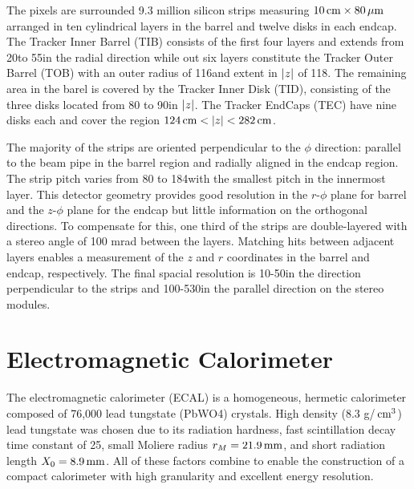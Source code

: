The pixels are surrounded 9.3 million silicon strips measuring $10\,\text{cm}\times 80\,\mu\text{m}$ arranged in ten cylindrical layers in the barrel and twelve disks in each endcap.
The Tracker Inner Barrel (TIB) consists of the first four layers and extends from 20\cm to 55\cm in the radial direction while out six layers constitute the Tracker Outer Barrel (TOB) with an outer radius of 116\cm and extent in $\lvert z \rvert$ of 118\cm.
The remaining area in the barel is covered by the Tracker Inner Disk (TID), consisting of the three disks located from 80 to 90\cm in $\lvert z \rvert$.
The Tracker EndCaps (TEC) have nine disks each and cover the region $124\,\text{cm} < \lvert z \rvert < 282\,\text{cm}$.

The majority of the strips are oriented perpendicular to the $\phi$ direction: parallel to the beam pipe in the barrel region and radially aligned in the endcap region.
The strip pitch varies from 80 to 184\mum with the smallest pitch in the innermost layer.
This detector geometry provides good resolution in the $r$-$\phi$ plane for barrel and the $z$-$\phi$ plane for the endcap but little information on the orthogonal directions.
To compensate for this, one third of the strips are double-layered with a stereo angle of 100 mrad between the layers.
Matching hits between adjacent layers enables a measurement of the $z$ and $r$ coordinates in the barrel and endcap, respectively.
The final spacial resolution is 10-50\mum in the direction perpendicular to the strips and 100-530\mum in the parallel direction on the stereo modules.


\section{Electromagnetic Calorimeter}

The electromagnetic calorimeter (ECAL) is a homogeneous, hermetic calorimeter
composed of 76,000 lead tungstate (PbWO4) crystals.
High density (8.3 g/$\,\text{cm}^3$) lead tungstate was chosen due to its radiation hardness, fast scintillation decay time constant of 25\ns, small Moliere radius $r_M= 21.9\,\text{mm}$, and short radiation length $X_0 = 8.9\,\text{mm}$.
All of these factors combine to enable the construction of a compact calorimeter with high granularity and excellent energy resolution.

